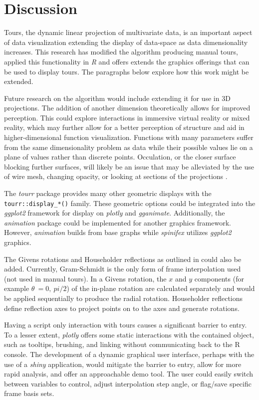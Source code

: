 \documentclass{monashthesis}
\begin{document}
\hypertarget{sec:discussion}{%
\section{Discussion}\label{sec:discussion}}

Tours, the dynamic linear projection of multivariate data, is an important aspect of data visualization extending the display of data-space as data dimensionality increases. This research has modified the algorithm producing manual tours, applied this functionality in \emph{R} and offers extends the graphics offerings that can be used to display tours. The paragraphs below explore how this work might be extended.

Future research on the algorithm would include extending it for use in 3D projections. The addition of another dimension theoretically allows for improved perception. This could explore interactions in immersive virtual reality or mixed reality, which may further allow for a better perception of structure and aid in higher-dimensional function visualization. Functions with many parameters suffer from the same dimensionality problem as data while their possible values lie on a plane of values rather than discrete points. Occulation, or the closer surface blocking further surfaces, will likely be an issue that may be alleviated by the use of wire mesh, changing opacity, or looking at sections of the projections \autocite{furnas_prosection_1994}.

The \emph{tourr} package provides many other geometric displays with the \texttt{tourr::display\_*()} family. These geometric options could be integrated into the \emph{ggplot2} framework for display on \emph{plotly} and \emph{gganimate}. Additionally, the \emph{animation} package \textcite{xie_animation:_2018} could be implemented for another graphics framework. However, \emph{animation} builds from base graphs while \emph{spinifex} utilizes \emph{ggplot2} graphics.

The Givens rotations and Householder reflections as outlined in \textcite{buja_computational_2005} could also be added. Currently, Gram-Schmidt is the only form of frame interpolation used (not used in manual tours). In a Givens rotation, the \(x\) and \(y\) components (for example \(\theta~= 0,~pi/2\)) of the in-plane rotation are calculated separately and would be applied sequentially to produce the radial rotation. Householder reflections define reflection axes to project points on to the axes and generate rotations.

Having a script only interaction with tours causes a significant barrier to entry. To a lesser extent, \emph{plotly} offers some static interactions with the contained object, such as tooltips, brushing, and linking without communicating back to the R console. The development of a dynamic graphical user interface, perhaps with the use of a \emph{shiny} \autocite{chang_shiny:_2018} application, would mitigate the barrier to entry, allow for more rapid analysis, and offer an approachable demo tool. The user could easily switch between variables to control, adjust interpolation step angle, or flag/save specific frame basis sets.

\printbibliography[heading=bibintoc]
\end{document}
